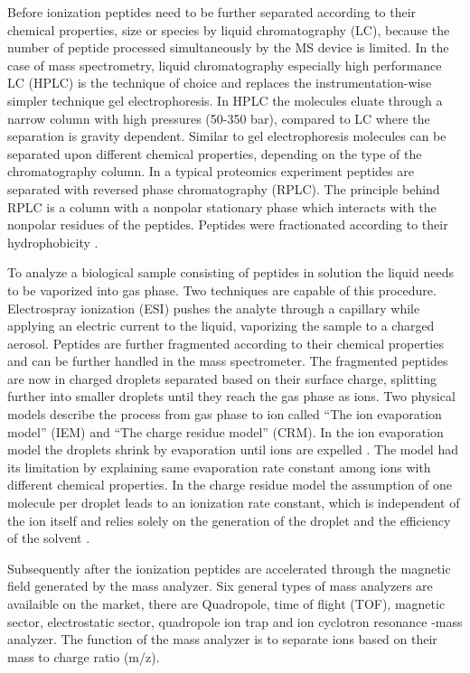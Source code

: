 \documentclass[
  11pt,
]{article}
\begin{document}
Before ionization peptides need to be further separated according to
their chemical properties, size or species by liquid chromatography
(LC), because the number of peptide processed simultaneously by the MS
device is limited. In the case of mass spectrometry, liquid
chromatography especially high performance LC (HPLC) is the technique of
choice and replaces the instrumentation-wise simpler technique gel
electrophoresis. In HPLC the molecules eluate through a narrow column
with high pressures (50-350 bar), compared to LC where the separation is
gravity dependent. Similar to gel electrophoresis molecules can be
separated upon different chemical properties, depending on the type of
the chromatography column. In a typical proteomics experiment peptides
are separated with reversed phase chromatography (RPLC). The principle
behind RPLC is a column with a nonpolar stationary phase which interacts
with the nonpolar residues of the peptides. Peptides were fractionated
according to their hydrophobicity \citep{Pitt2009}.

To analyze a biological sample consisting of peptides in solution the
liquid needs to be vaporized into gas phase. Two techniques are capable
of this procedure. Electrospray ionization (ESI) pushes the analyte
through a capillary while applying an electric current to the liquid,
vaporizing the sample to a charged aerosol. Peptides are further
fragmented according to their chemical properties and can be further
handled in the mass spectrometer. The fragmented peptides are now in
charged droplets separated based on their surface charge, splitting
further into smaller droplets until they reach the gas phase as ions.
Two physical models describe the process from gas phase to ion called
``The ion evaporation model'' (IEM) and ``The charge residue model''
(CRM). In the ion evaporation model the droplets shrink by evaporation
until ions are expelled \citep{Iribarne1976}. The model had its
limitation by explaining same evaporation rate constant among ions with
different chemical properties. In the charge residue model the
assumption of one molecule per droplet leads to an ionization rate
constant, which is independent of the ion itself and relies solely on
the generation of the droplet and the efficiency of the solvent
\citep{Wilm2011}.

Subsequently after the ionization peptides are accelerated through the
magnetic field generated by the mass analyzer. Six general types of mass
analyzers are availaible on the market, there are Quadropole, time of
flight (TOF), magnetic sector, electrostatic sector, quadropole ion trap
and ion cyclotron resonance -mass analyzer. The function of the mass
analyzer is to separate ions based on their mass to charge ratio (m/z).
\end{document}
